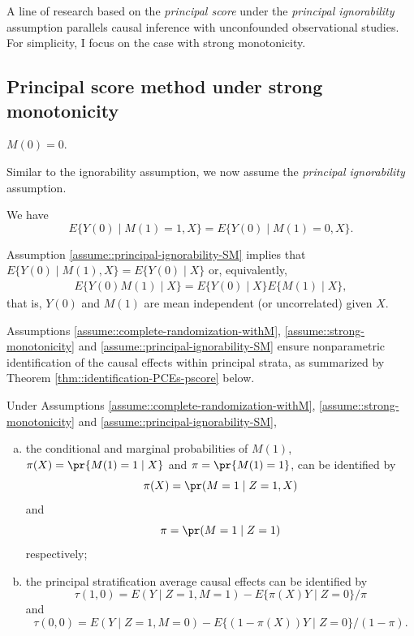 A line of research based on the {\it principal score} under the {\it principal ignorability} assumption parallels causal inference with unconfounded observational studies. For simplicity, I focus on the case with strong monotonicity. 



\subsection{Principal score method under strong monotonicity}

\begin{assumption}
\label{assume::strong-monotonicity}
 $M(0) = 0$. 
\end{assumption}


Similar to the ignorability assumption, we now assume the {\it principal ignorability} assumption. 


\begin{assumption}
\label{assume::principal-ignorability-SM}
We have 
$$
E\{  Y(0) \mid M(1) = 1, X \} = E\{  Y(0) \mid M(1) = 0, X \} .
$$ 
\end{assumption}


Assumption \ref{assume::principal-ignorability-SM} implies that
$
E\{  Y(0) \mid M(1)  , X \} = E\{  Y(0) \mid   X \} 
$
or, equivalently, 
\begin{eqnarray}
\label{eq::mean-independent}
E\{  Y(0)  M(1)  \mid  X \}  =  E\{  Y(0) \mid   X \}  E\{     M(1)  \mid  X \}  ,
\end{eqnarray}
that is, $Y(0)$ and $M(1)$ are mean independent (or uncorrelated) given $X$. 

Assumptions \ref{assume::complete-randomization-withM}, \ref{assume::strong-monotonicity} and \ref{assume::principal-ignorability-SM} ensure nonparametric identification of the causal effects within principal strata, as summarized by Theorem \ref{thm::identification-PCEs-pscore} below. 


\begin{theorem}
\label{thm::identification-PCEs-pscore}
Under Assumptions \ref{assume::complete-randomization-withM}, \ref{assume::strong-monotonicity} and \ref{assume::principal-ignorability-SM}, 
\begin{enumerate}
[(a)]
\item 
the conditional and marginal probabilities of $M(1)$, 
$\pi(X) =  \pr\{ M(1)=1\mid X \}  $ and $\pi =  \pr\{ M(1)=1\} $, can be identified by
$$
\pi(X)   =  \pr(M=1\mid Z=1, X ) 
$$ 
and 
$$
\pi  =   \pr(M=1\mid Z=1 ) 
$$ 
respectively; 
\item
the principal  stratification average causal effects can be identified by 
$$
\tau(1,0) = E(Y\mid Z=1, M=1)  - E\{  \pi(X) Y  \mid Z=0 \}/\pi 
$$
and
$$
\tau(0,0) = E(Y\mid Z=1, M=0)  - E\{ (1-\pi(X)) Y  \mid Z=0 \}/(1-\pi) . 
$$
\end{enumerate}
\end{theorem}


